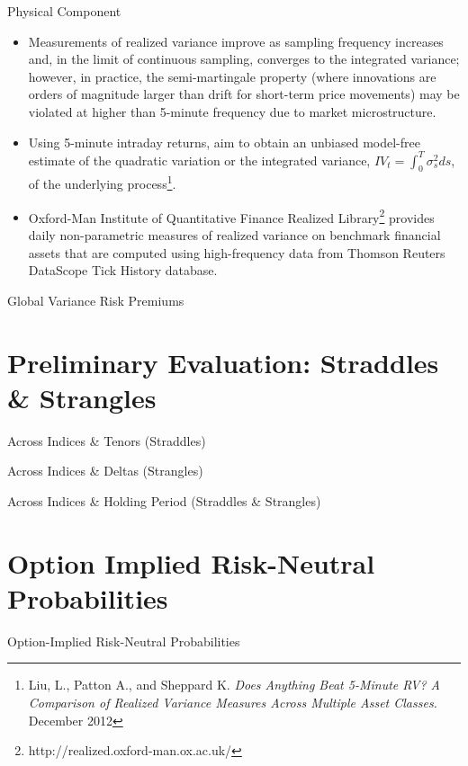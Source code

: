 \documentclass{beamer}
\begin{document}
\begin{frame}{Physical Component}
\begin{itemize}
\item Measurements of realized variance improve as sampling frequency increases and, in the limit of continuous sampling, converges to the integrated variance; however, in practice, the semi-martingale property (where innovations are orders of magnitude larger than drift for short-term price movements) may be violated at higher than 5-minute frequency due to market microstructure.
\item Using 5-minute intraday returns, aim to obtain an unbiased model-free estimate of the quadratic variation or the integrated variance, $IV_{t}=\int_{0}^{T}\sigma^2_{s}ds$, of the underlying process\footnote{\tiny Liu, L., Patton A., and Sheppard K. {\em Does Anything Beat 5-Minute RV? A Comparison of Realized Variance Measures Across Multiple Asset Classes.} December 2012}.
\item Oxford-Man Institute of Quantitative Finance Realized Library\footnote{\tiny http://realized.oxford-man.ox.ac.uk/} provides daily non-parametric measures of realized variance on benchmark financial assets that are computed using high-frequency data from Thomson Reuters DataScope Tick History database.
\end{itemize}
\end{frame}

\begin{frame}{Global Variance Risk Premiums}
\end{frame}

\section{Preliminary Evaluation: Straddles \& Strangles}
\begin{frame}{Across Indices \& Tenors (Straddles)}
\end{frame}

\begin{frame}{Across Indices \& Deltas (Strangles)}
\end{frame}

\begin{frame}{Across Indices \& Holding Period (Straddles \& Strangles)}
\end{frame}

\section{Option Implied Risk-Neutral Probabilities}
\begin{frame}{Option-Implied Risk-Neutral Probabilities}
\end{frame}
\end{document}
